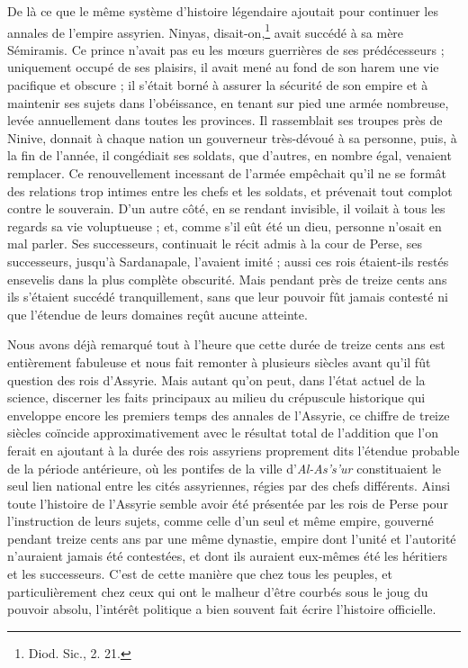 \documentclass[a4paper, 11pt, oneside]{article}
\begin{document}
De là ce que le même système d'histoire légendaire ajoutait pour continuer les annales de l'empire assyrien. Ninyas, disait-on,\footnote{Diod. Sic., 2. 21.} avait succédé à sa mère Sémiramis. Ce prince n'avait pas eu les mœurs guerrières de ses prédécesseurs ; uniquement occupé de ses plaisirs, il avait mené au fond de son harem une vie pacifique et obscure ; il s'était borné à assurer la sécurité de son empire et à maintenir ses sujets dans l'obéissance, en tenant sur pied une armée nombreuse, levée annuellement dans toutes les provinces. Il rassemblait ses troupes près de Ninive, donnait à chaque nation un gouverneur très-dévoué à sa personne, puis, à la fin de l'année, il congédiait ses soldats, que d'autres, en nombre égal, venaient remplacer. Ce renouvellement incessant de l'armée empêchait qu'il ne se formât des relations trop intimes entre les chefs et les soldats, et prévenait tout complot contre le souverain. D'un autre côté, en se rendant invisible, il voilait à tous les regards sa vie voluptueuse ; et, comme s'il eût été un dieu, personne n'osait en mal parler. Ses successeurs, continuait le récit admis à la cour de Perse, ses successeurs, jusqu'à Sardanapale, l'avaient imité ; aussi ces rois étaient-ils restés ensevelis dans la plus complète obscurité. Mais pendant près de treize cents ans ils s'étaient succédé tranquillement, sans que leur pouvoir fût jamais contesté ni que l'étendue de leurs domaines reçût aucune atteinte.

Nous avons déjà remarqué tout à l'heure que cette durée de treize cents ans est entièrement fabuleuse et nous fait remonter à plusieurs siècles avant qu'il fût question des rois d'Assyrie. Mais autant qu'on peut, dans l'état actuel de la science, discerner les faits principaux au milieu du crépuscule historique qui enveloppe encore les premiers temps des annales de l'Assyrie, ce chiffre de treize siècles coïncide approximativement avec le résultat total de l'addition que l'on ferait en ajoutant à la durée des rois assyriens proprement dits l'étendue probable de la période antérieure, où les pontifes de la ville d'\emph{Al-As's'ur} constituaient le seul lien national entre les cités assyriennes, régies par des chefs différents. Ainsi toute l'histoire de l'Assyrie semble avoir été présentée par les rois de Perse pour l'instruction de leurs sujets, comme celle d'un seul et même empire, gouverné pendant treize cents ans par une même dynastie, empire dont l'unité et l'autorité n'auraient jamais été contestées, et dont ils auraient eux-mêmes été les héritiers et les successeurs. C'est de cette manière que chez tous les peuples, et particulièrement chez ceux qui ont le malheur d'être courbés sous le joug du pouvoir absolu, l'intérêt politique a bien souvent fait écrire l'histoire officielle.
\end{document}

